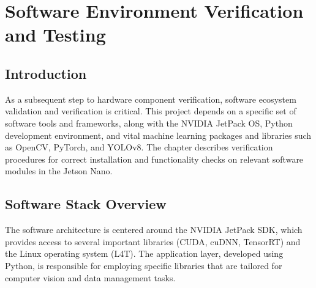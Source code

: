 %
%
%
\chapter{Software Environment Verification and Testing} \label{ch:software_test}


\section{Introduction}
As a subsequent step to hardware component verification, software ecosystem validation and verification is critical. This project depends on a specific set of software tools and frameworks, along with the NVIDIA JetPack OS, Python development environment, and vital machine learning packages and libraries such as OpenCV, PyTorch, and YOLOv8. The chapter describes verification procedures for correct installation and functionality checks on relevant software modules in the Jetson Nano.

\section{Software Stack Overview}
The software architecture is centered around the NVIDIA JetPack SDK, which provides access to several important libraries (CUDA, cuDNN, TensorRT) and the Linux operating system (L4T). The application layer, developed using Python, is responsible for employing specific libraries that are tailored for computer vision and data management tasks.

